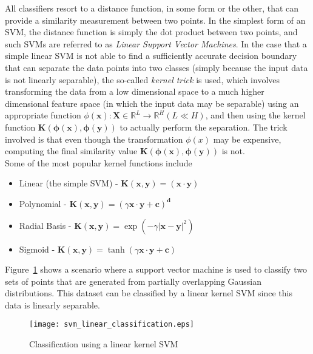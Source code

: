 All classifiers resort to a distance function, in some form or the other, that can provide a similarity measurement between two points. In the simplest form of an SVM, the distance function is simply the dot product between two points, and such SVMs are referred to as \emph{Linear Support Vector Machines}. In the case that a simple linear SVM is not able to find a sufficiently accurate decision boundary that can separate the data points into two classes (simply because the input data is not linearly separable), the so-called \emph{kernel trick} is used, which involves transforming the data from a low dimensional space to a much higher dimensional feature space (in which the input data may be separable) using an appropriate function $\phi(\mathbf{x}): \mathbf{X} \in \mathbb{R}^{L} \rightarrow \mathbb{R}^H (L \ll H)$, and then using the kernel function $\mathbf{K(\phi(x), \phi(y))}$ to actually perform the separation. The trick involved is that even though the transformation $\phi(x)$ may be expensive, computing the final similarity value $\mathbf{K(\phi(x), \phi(y))}$ is not.\\

Some of the most popular kernel functions include
\begin{itemize}
    \item{Linear (the simple SVM) - $\mathbf{K(x, y)} = (\mathbf{x} \cdot \mathbf{y})$ }
    \item{Polynomial - $\mathbf{K(x, y)} = (\gamma \mathbf{x} \cdot \mathbf{y} + \mathbf{c})^{\mathbf{d}}$}
    \item{Radial Basis - $\mathbf{K(x, y)} = \exp(-\gamma {| \mathbf{x} - \mathbf{y} |}^{2})$}
    \item{Sigmoid - $\mathbf{K(x, y)} = \tanh(\gamma \mathbf{x} \cdot \mathbf{y} + \mathbf{c})$}
\end{itemize}

Figure~\ref{fig:svm_linear_classify} shows a scenario where a support vector machine is used to classify two sets of points that are generated from partially overlapping Gaussian distributions. This dataset can be classified by a linear kernel SVM since this data is linearly separable.\\

\begin{figure}[t!]
    \centering
    \texttt{[image: svm\_linear\_classification.eps]}
    \caption{Classification using a linear kernel SVM}
    \label{fig:svm_linear_classify}
\end{figure}

